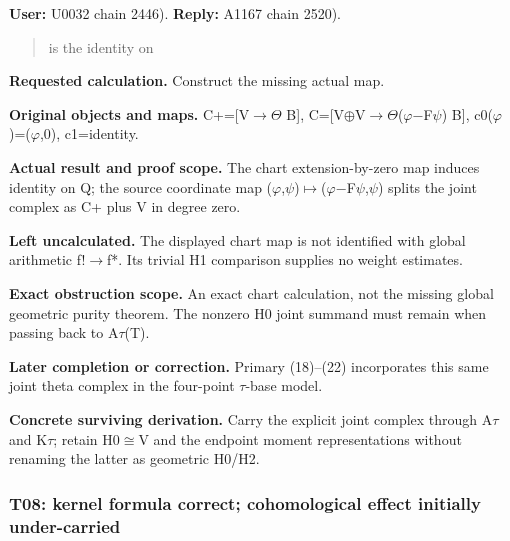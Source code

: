 \documentclass[10pt,a4paper,oneside]{report}
\begin{document}
\textbf{User:} U0032
\protect{} chain 2446).
\textbf{Reply:} A1167
\protect{} chain 2520).

\begin{quote}
is the identity on
\end{quote}

\textbf{Requested calculation.} Construct the missing actual map.

\textbf{Original objects and maps.}
C+=[V\allowbreak{}\ensuremath{→}\allowbreak{}\allowbreak{}\ensuremath{Θ}\allowbreak{}
B{]},
C=[V\allowbreak{}\ensuremath{⊕}\allowbreak{}V\allowbreak{}\ensuremath{→}\allowbreak{}\allowbreak{}\ensuremath{Θ}\allowbreak{}(\allowbreak{}\ensuremath{φ}\allowbreak{}\allowbreak{}\ensuremath{−}\allowbreak{}F\allowbreak{}\ensuremath{ψ}\allowbreak{})
B{]},
c0(\allowbreak{}\ensuremath{φ}\allowbreak{})=(\allowbreak{}\ensuremath{φ}\allowbreak{},0),
c1=identity.

\textbf{Actual result and proof scope.} The chart extension-by-zero map
induces identity on Q; the source coordinate map
(\allowbreak{}\ensuremath{φ}\allowbreak{},\allowbreak{}\ensuremath{ψ}\allowbreak{})\allowbreak{}\ensuremath{↦}\allowbreak{}(\allowbreak{}\ensuremath{φ}\allowbreak{}\allowbreak{}\ensuremath{−}\allowbreak{}F\allowbreak{}\ensuremath{ψ}\allowbreak{},\allowbreak{}\ensuremath{ψ}\allowbreak{})
splits the joint complex as C+ plus V in degree zero.

\textbf{Left uncalculated.} The displayed chart map is not identified
with global arithmetic f!\allowbreak{}\ensuremath{→}\allowbreak{}f*. Its
trivial H1 comparison supplies no weight estimates.

\textbf{Exact obstruction scope.} An exact chart calculation, not the
missing global geometric purity theorem. The nonzero H0 joint summand
must remain when passing back to
A\allowbreak{}\ensuremath{τ}\allowbreak{}(T).

\textbf{Later completion or correction.} Primary (18)--(22) incorporates
this same joint theta complex in the four-point
\allowbreak{}\ensuremath{τ}\allowbreak{}-base model.

\textbf{Concrete surviving derivation.} Carry the explicit joint complex
through A\allowbreak{}\ensuremath{τ}\allowbreak{} and
K\allowbreak{}\ensuremath{τ}\allowbreak{}; retain
H0\allowbreak{}\ensuremath{≅}\allowbreak{}V and the endpoint moment
representations without renaming the latter as geometric H0/H2.

\subsubsection{T08: kernel formula correct; cohomological effect
initially
under-carried}\label{t08-kernel-formula-correct-cohomological-effect-initially-under-carried}
\end{document}
